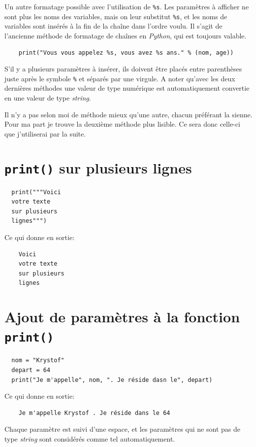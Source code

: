 \documentclass[a4paper,12pt]{book}
\begin{document}
Un autre formatage possible avec l'utilisation de \texttt{\%s}. Les paramètres à afficher ne sont plus les noms des variables, mais on leur substitut \texttt{\%s}, et les noms de variables sont insérés à la fin de la chaîne dans l'ordre voulu. Il s'agit de l'ancienne méthode de formatage de chaînes en \textit{Python}, qui est toujours valable.
\begin{verbatim}
    print("Vous vous appelez %s, vous avez %s ans." % (nom, age))
\end{verbatim}
\medskip

S'il y a plusieurs paramètres à insérer, ils doivent être placés entre parenthèses juste après le symbole \texttt{\%} et séparés par une virgule. A noter qu'avec les deux dernières méthodes une valeur de type numérique est automatiquement convertie en une valeur de type \textit{string}.
\medskip

Il n'y a pas selon moi de méthode mieux qu'une autre, chacun préférant la sienne. Pour ma part je trouve la deuxième méthode plus lisible. Ce sera donc celle-ci que j'utiliserai par la suite.
\medskip

\section{\texttt{print()} sur plusieurs lignes}
\begin{lstlisting}
  print("""Voici
  votre texte
  sur plusieurs
  lignes""")
\end{lstlisting}
\medskip

Ce qui donne en sortie:
\begin{verbatim}
    Voici
    votre texte
    sur plusieurs
    lignes
\end{verbatim}
\medskip

\section{Ajout de paramètres à la fonction \texttt{print()}}
\begin{lstlisting}
  nom = "Krystof"
  depart = 64
  print("Je m'appelle", nom, ". Je réside dasn le", depart)
\end{lstlisting}
\medskip

Ce qui donne en sortie:
\begin{verbatim}
    Je m'appelle Krystof . Je réside dans le 64
\end{verbatim}
\medskip

Chaque paramètre est suivi d'une espace, et les paramètres qui ne sont pas de type \textit{string} sont considérés comme tel automatiquement.
\medskip
\end{document}
